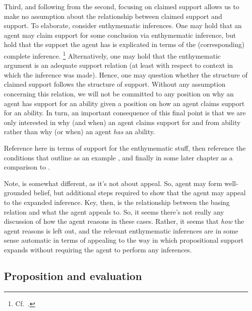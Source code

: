 \begin{note}
  Third, and following from the second, focusing on claimed support allows us to make no assumption about the relationship between claimed support and support.
  To elaborate, consider enthymematic inferences.
  One may hold that an agent may claim support for some conclusion via enthymematic inference, but hold that the support the agent has is explicated in terms of the (corresponding) complete inference.\nolinebreak
  \footnote{
    Cf.\ \textcite{Moretti:2019wx}.
  }
  Alternatively, one may hold that the enthymematic argument is an adequate support relation (at least with respect to context in which the inference was made).
  Hence, one may question whether the structure of claimed support follows the structure of support.
  Without any assumption concerning this relation, we will not be committed to any position on why an agent has support for an ability given a position on how an agent claims support for an ability.
  In turn, an important consequence of this final point is that we are only interested in why (and when) an agent claims support for and from ability rather than why (or when) an agent \emph{has} an ability.

  {
    \color{red}
    Reference \citeauthor{Moretti:2019wx} here in terms of support for the enthymematic stuff, then reference the conditions that \citeauthor{Moretti:2019wx} outline as an example \ESU{}, and finally in some later chapter as a comparison to \EAS{}.
    \citeauthor{Moretti:2019wx}

    Note, \citeauthor{Moretti:2019wx} is somewhat different, as it's not about appeal.
    So, agent may form well-grounded belief, but additional steps required to show that the agent may appeal to the expanded inference.
    Key, then, is the relationship between the basing relation and what the agent appeals to.
    So, it seems there's not really any discussion of how the agent reasons in these cases.
    Rather, it seems that \emph{how} the agent reasons is left out, and the relevant enthymematic inferences are in some sense automatic in terms of appealing to the way in which propositional support expands without requiring the agent to perform any inferences.
  }
\end{note}





\subsection{Proposition and evaluation}

